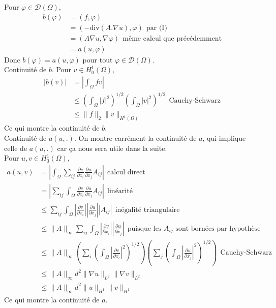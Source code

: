 \documentclass[a4paper,12pt]{article}
\newcommand{\Ho}{H^1_0(\Omega)}
\begin{document}
Pour $\varphi \in \mathcal{D}(\Omega)$,
\begin{align*}
b(\varphi) & = (f,\varphi) \\
& = (-\text{div}(A. \nabla u), \varphi) \ \ \text{par (I)} \\
& = (A \nabla u, \nabla \varphi)  \ \ \text{même calcul que précédemment} \\
& = a(u, \varphi)
\end{align*}
Donc $\boxed{b(\varphi)=a(u, \varphi)}$ pour tout $\varphi \in \mathcal{D}(\Omega)$. \\

Continuité de $b$. Pour $v \in H^1_0(\Omega)$, 
\begin{align*}
|b(v)| & = |\int_{\Omega} f v| \\
& \leq (\int_{\Omega} |f|^2)^{1/2} (\int_{\Omega} |v|^2)^{1/2} \ \ \text{Cauchy-Schwarz} \\
& \boxed{\leq \|f\|_2 \|v\|_{H^1(\Omega)}}
\end{align*}
Ce qui montre la continuité de $b$. \\

Continuité de $a(u,.)$. On montre carrément la continuité de $a$, qui implique celle de $a(u,.)$ car ça nous sera utile dans la suite. \\

Pour $u,v \in \Ho$, 
\begin{align*}
a(u,v) & = \left| \int_{\Omega} \sum_{ij} \frac{\partial v}{\partial x_i} \frac{\partial u}{\partial x_j} A_{ij} \right| \ \ \text{calcul direct} \\
& = \left| \sum_{ij} \int_{\Omega} \frac{\partial v}{\partial x_i} \frac{\partial u}{\partial x_j} A_{ij} \right| \ \ \text{linéarité} \\
& \leq \sum_{ij} \int_{\Omega} \left|\frac{\partial v}{\partial x_i} \right| \left| \frac{\partial u}{\partial x_j} \right| \left|A_{ij} \right|  \ \ \text{inégalité triangulaire} \\
& \leq \|A\|_{\infty} \sum_{ij} \int_{\Omega} \left|\frac{\partial v}{\partial x_i} \right| \left| \frac{\partial u}{\partial x_j} \right| \ \ \text{puisque les } A_{ij} \text{ sont bornées par hypothèse} \\
& \leq \|A\|_{\infty} \left( \sum_{i} \left(\int_{\Omega} \left| \frac{\partial v}{\partial x_i} \right|^2 \right)^{1/2} \right) \left( \sum_{j} \left(\int_{\Omega} \left| \frac{\partial u}{\partial x_j} \right|^2 \right)^{1/2} \right) \ \ \text{Cauchy-Schwarz} \\
& \leq \|A\|_{\infty} d^2 \| \nabla u\|_{L^2} \|\nabla v\|_{L^2} \\
& \boxed{\leq \|A\|_{\infty} d^2 \|u\|_{H^1} \| v\|_{H^1}}
\end{align*}
Ce qui montre la continuité de $a$. \\
\end{document}
